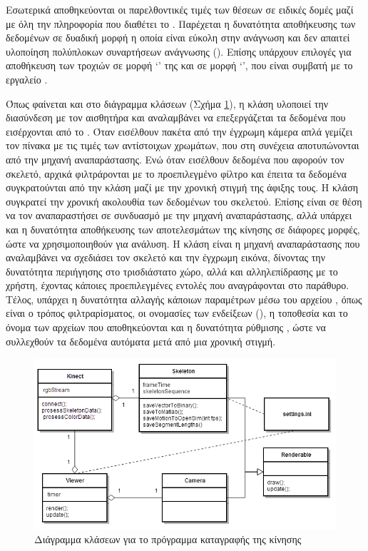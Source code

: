 Εσωτερικά αποθηκεύονται οι παρελθοντικές τιμές των θέσεων σε ειδικές δομές μαζί με όλη την πληροφορία που διαθέτει το . Παρέχεται η δυνατότητα αποθήκευσης των δεδομένων σε δυαδική μορφή η οποία είναι εύκολη στην ανάγνωση και δεν απαιτεί υλοποίηση πολύπλοκων συναρτήσεων ανάγνωσης (). Επίσης υπάρχουν επιλογές για αποθήκευση των τροχιών σε μορφή \lq {}\rq\; της  και σε μορφή \lq {}\rq  , που είναι συμβατή με το εργαλείο .

Όπως φαίνεται και στο διάγραμμα κλάσεων (Σχήμα \ref{fig:motion-capture-class-diagram}), η κλάση  υλοποιεί την διασύνδεση με τον αισθητήρα και αναλαμβάνει να επεξεργάζεται τα δεδομένα που εισέρχονται από το . Όταν εισέλθουν πακέτα από την έγχρωμη κάμερα απλά γεμίζει τον πίνακα  με τις τιμές των αντίστοιχων χρωμάτων, που στη συνέχεια αποτυπώνονται από την μηχανή αναπαράστασης. Ενώ όταν εισέλθουν δεδομένα που αφορούν τον σκελετό, αρχικά φιλτράρονται με το προεπιλεγμένο φίλτρο και έπειτα τα δεδομένα συγκρατούνται από την κλάση  μαζί με την χρονική στιγμή της άφιξης τους. Η κλάση  συγκρατεί την χρονική ακολουθία των δεδομένων του σκελετού. Επίσης είναι σε θέση να τον αναπαραστήσει σε συνδυασμό με την μηχανή αναπαράστασης, αλλά υπάρχει και η δυνατότητα αποθήκευσης των αποτελεσμάτων της κίνησης σε διάφορες μορφές, ώστε να χρησιμοποιηθούν για ανάλυση. Η κλάση  είναι η μηχανή αναπαράστασης που αναλαμβάνει να σχεδιάσει τον σκελετό και την έγχρωμη εικόνα, δίνοντας την δυνατότητα περιήγησης στο τρισδιάστατο χώρο, αλλά και αλληλεπίδρασης με το χρήστη, έχοντας κάποιες προεπιλεγμένες εντολές που αναγράφονται στο παράθυρο. Τέλος, υπάρχει η δυνατότητα αλλαγής κάποιων παραμέτρων μέσω του αρχείου , όπως είναι ο τρόπος φιλτραρίσματος, οι ονομασίες των ενδείξεων (), η τοποθεσία και το όνομα των αρχείων που αποθηκεύονται και η δυνατότητα ρύθμισης , ώστε να συλλεχθούν τα δεδομένα αυτόματα μετά από μια χρονική στιγμή.

\begin{figure}[H]
    \centering
    \includegraphics[width=.9\textwidth, keepaspectratio]{fig/motion-capture-class-diagram.png}
    \caption{Διάγραμμα κλάσεων για το πρόγραμμα καταγραφής της κίνησης}
    \label{fig:motion-capture-class-diagram}
\end{figure}

